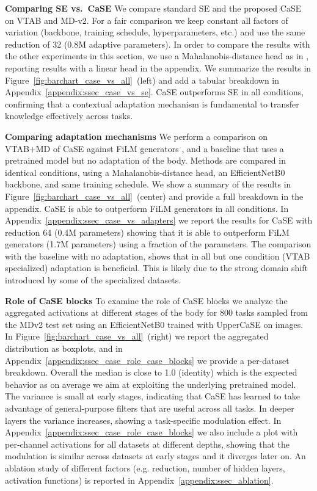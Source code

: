 \documentclass{article}
\begin{document}
\textbf{Comparing SE vs.~CaSE} We compare standard SE and the proposed CaSE on VTAB and MD-v2. For a fair comparison we keep constant all factors of variation (backbone, training schedule, hyperparameters, etc.) and use the same reduction of 32 (0.8M adaptive parameters). In order to compare the results with the other experiments in this section, we use a Mahalanobis-distance head as in \cite{bronskill2021memory}, reporting results with a linear head in the appendix. We summarize the results in Figure~\ref{fig:barchart_case_vs_all}~(left) and add a tabular breakdown in Appendix~\ref{appendix:ssec_case_vs_se}. CaSE outperforms SE in all conditions, confirming that a contextual adaptation mechanism is fundamental to transfer knowledge effectively across tasks.

\textbf{Comparing adaptation mechanisms} We perform a comparison on VTAB+MD of CaSE against FiLM generators \citep{bronskill2021memory}, and a baseline that uses a pretrained model but no adaptation of the body. Methods are compared in identical conditions, using a Mahalanobis-distance head, an EfficientNetB0 backbone, and same training schedule.
We show a summary of the results in Figure~\ref{fig:barchart_case_vs_all}~(center) and provide a full breakdown in the appendix. CaSE is able to outperform FiLM generators in all conditions. In Appendix~\ref{appendix:ssec_case_vs_adapters} we report the results for CaSE with reduction 64 (0.4M parameters) showing that it is able to outperform FiLM generators (1.7M parameters) using a fraction of the parameters. The comparison with the baseline with no adaptation, shows that in all but one condition (VTAB specialized) adaptation is beneficial. This is likely due to the strong domain shift introduced by some of the specialized datasets.


\textbf{Role of CaSE blocks} To examine the role of CaSE blocks we analyze the aggregated activations at different stages of the body for 800 tasks sampled from the MDv2 test set using an EfficientNetB0 trained with UpperCaSE on  images.
In Figure~\ref{fig:barchart_case_vs_all}~(right) we report the aggregated distribution as boxplots, and in Appendix~\ref{appendix:ssec_case_role_case_blocks} we provide a per-dataset breakdown. Overall the median is close to 1.0 (identity) which is the expected behavior as on average we aim at exploiting the underlying pretrained model. The variance is small at early stages, indicating that CaSE has learned to take advantage of general-purpose filters that are useful across all tasks. In deeper layers the variance increases, showing a task-specific modulation effect. In Appendix~\ref{appendix:ssec_case_role_case_blocks} we also include a plot with per-channel activations for all datasets at different depths, showing that the modulation is similar across datasets at early stages and it diverges later on. An ablation study of different factors (e.g. reduction, number of hidden layers, activation functions) is reported in Appendix~\ref{appendix:ssec_ablation}.
\end{document}
